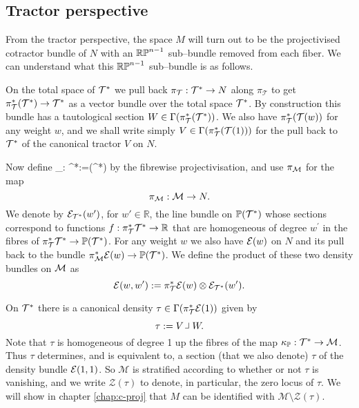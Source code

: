 \subsection{Tractor perspective} \label{sec:trac_construction}

From the tractor perspective, the space $M$ will turn out to be the projectivised cotractor bundle of $N$ with an $\mathbb{RP}^{n-1}$ sub--bundle removed from each fiber. We can understand what this $\mathbb{RP}^{n-1}$ sub--bundle is as follows.

On the total space of $\mathcal{T}^*$ we pull back $\pi_\mathcal{T}:\mathcal{T}^*\to N$ along $\pi_\mathcal{T}$ to get $\pi_\mathcal{T}^*(\mathcal{T}^*)\to \mathcal{T}^*$ as a vector bundle over the total space $\mathcal{T}^*$. By construction this bundle has a tautological section $W\in \Gamma (\pi_{\mathcal{T}}^*(\mathcal{T}^*))$.  We also have $\pi_{\mathcal{T}}^*(\mathcal{T}(w))$ for any weight $w$, and we shall write simply $V\in \Gamma(\pi_{\mathcal{T}}^*(\mathcal{T}(1)))$ for the pull back to $\mathcal{T}^*$ of the canonical tractor $V$ on $N$.

Now define
\be
\label{projection_map}
\kappa_\PP: \cT^*\longrightarrow {}:=(\cT^*)
\ee
by the fibrewise projectivisation, and use $\pi_{\mathcal{M}}$ for the map
$$
\pi_{\mathcal{M}}:\mathcal{M}\to N.
$$
We denote by $\mathcal{E}_{\mathcal{T}^*}(w')$, for $w'\in \mathbb{R}$, the line
bundle on $\mathbb{P}(\mathcal{T}^*)$ whose sections correspond to functions
$f: \pi_{\mathcal{T}}^*\mathcal{T}^* \to\mathbb{R} $ that are homogeneous of degree $w^\prime$ in
the fibres of $\pi_{\mathcal{T}}^*\mathcal{T}^*\to \mathbb{P}(\mathcal{T}^*)$. For any weight $w$ we also have $\mathcal{E}(w)$ on $N$ and its pull back to the bundle $\pi_{\mathcal{M}}^*\mathcal{E}(w)\to \mathbb{P}(\mathcal{T}^*)$.
We define the product of these two density bundles on $\mathcal{M}$ as
$$
\mathcal{E}(w,w'):= \pi_{\mathcal{T}}^*\mathcal{E}(w) \otimes \mathcal{E}_{\mathcal{T}^*}(w').
$$

On $\mathcal{T}^*$ there is  a canonical density $\tau\in \Gamma(\pi_{\mathcal{T}}^*\mathcal{E}(1))$ given by
$$
\tau:= V\hook W .
$$
Note that $\tau$ is homogeneous of degree 1 up the fibres of the
map $\kappa_{\mathbb{P}}:\mathcal{T}^*\to \mathcal{M}$. Thus $\tau$ determines, and is equivalent
to, a section (that we also denote) $\tau$ of the density bundle $\mathcal{E}(1,1)$. So $\mathcal{M}$ is stratified according to
whether or not $\tau$ is vanishing, and we write $\mathcal{Z}(\tau)$
to denote, in particular, the zero locus of $\tau$. We will show in chapter \ref{chap:c-proj} that $M$ can be identified with $\mathcal{M}\setminus \mathcal{Z}(\tau)$.



